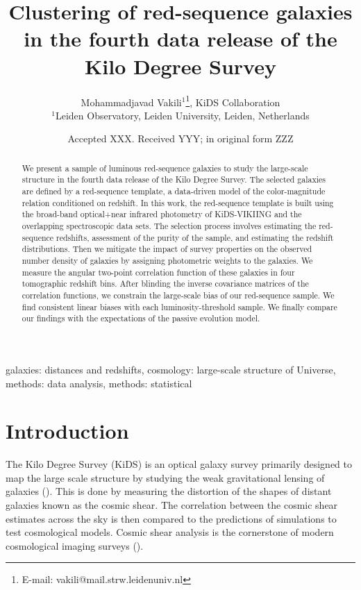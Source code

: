 \documentclass[fleqn,usenatbib,useAMS]{mnras}
\title[KiDS DR4 LRG clustering]{Clustering of red-sequence galaxies in the fourth data release of the Kilo Degree Survey}
\author[M. Vakili et al.]{
Mohammadjavad Vakili$^{1}$\thanks{E-mail: vakili@mail.strw.leidenuniv.nl}, KiDS Collaboration\\
$^{1}$Leiden Observatory, Leiden University, Leiden, Netherlands
}
\date{Accepted XXX. Received YYY; in original form ZZZ}
\begin{document}
\label{firstpage}
\pagerange{\pageref{firstpage}--\pageref{lastpage}}
\maketitle

\begin{abstract}

We present a sample of luminous red-sequence galaxies to study the large-scale structure in the fourth data release of the Kilo Degree Survey. The selected galaxies are defined by a red-sequence template, a data-driven model of the color-magnitude relation conditioned on redshift. In this work, the red-sequence template is built using the broad-band optical+near infrared photometry of KiDS-VIKIING and the overlapping spectroscopic data sets. The selection process involves estimating the red-sequence redshifts, assessment of the purity of the sample, and estimating the redshift distributions. Then we mitigate the impact of survey properties on the observed number density of galaxies by assigning photometric weights to the galaxies. We measure the angular two-point correlation function of these galaxies in four tomographic redshift bins. After blinding the inverse covariance matrices of the correlation functions, we constrain the large-scale bias of our red-sequence sample. We find consistent linear biases with each luminosity-threshold sample. We finally compare our findings with the expectations of the passive evolution model.

\end{abstract}

\begin{keywords}
galaxies: distances and redshifts, cosmology: large-scale structure of Universe, methods: data analysis, methods: statistical
\end{keywords}


\section{Introduction}

The Kilo Degree Survey (KiDS) is an optical galaxy survey primarily designed to map the large scale structure by studying the weak gravitational lensing of galaxies (\citealt{kuijken2015, hendrick2017, kuijken2019, hendrik2020}). This is done by measuring the distortion of the shapes of distant galaxies known as the cosmic shear. The correlation between the cosmic shear estimates across the sky is then compared to the predictions of simulations to test cosmological models. Cosmic shear analysis is the cornerstone of modern cosmological imaging surveys (\citealt{heymans2013,jee2016,hendrick2017,joudaki2017,troxel2017,joudaki2019, hikage2019}). 
\end{document}
